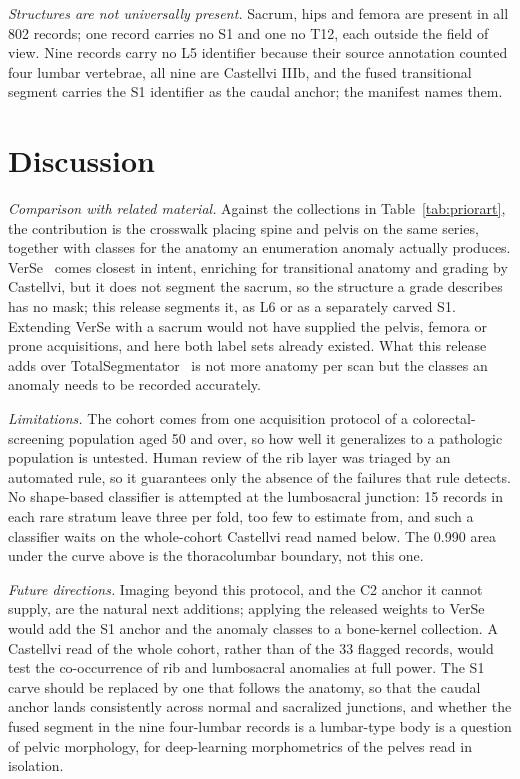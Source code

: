 \documentclass[aapm,mph,amsmath,amssymb,reprint]{revtex4-2}
\begin{document}
\emph{Structures are not universally present.} Sacrum, hips and femora are present in all 802 records; one record carries no S1 and one no T12, each outside the field of view. Nine records carry no L5 identifier because their source annotation counted four lumbar vertebrae, all nine are Castellvi IIIb, and the fused transitional segment carries the S1 identifier as the caudal anchor; the manifest names them.

\section{Discussion}

\emph{Comparison with related material.} Against the collections in
Table~\ref{tab:priorart}, the contribution is the crosswalk placing spine and pelvis on the
same series, together with classes for the anatomy an enumeration anomaly actually produces. VerSe~\cite{verse2021,versedata2021} comes closest in intent, enriching for transitional anatomy and grading by Castellvi, but it does not segment the sacrum, so the structure a grade describes has no mask; this release segments it, as L6 or as a separately carved S1. Extending VerSe with a sacrum would not have supplied the pelvis, femora or prone acquisitions, and here both label sets already existed.  What this release adds over TotalSegmentator~\cite{totalsegmentator} is not more anatomy per scan but the classes an anomaly needs to be recorded accurately. 

\emph{Limitations.}\label{sec:limitations} The cohort comes from one acquisition protocol of a colorectal-screening population aged 50 and over, so how well it generalizes to a pathologic population is untested. Human review of the rib layer was triaged by an automated rule, so it guarantees only the absence of the failures that rule detects. No shape-based classifier is attempted at the lumbosacral junction: 15 records in each rare stratum leave three per fold, too few to estimate from, and such a classifier waits on the whole-cohort Castellvi read named below. The 0.990 area under the curve above is the thoracolumbar boundary, not this one. 

\emph{Future directions.} Imaging beyond this protocol, and the C2 anchor it cannot supply, are the natural next additions; applying the released weights to VerSe would add the S1 anchor and the anomaly classes to a bone-kernel collection. A Castellvi read of the whole cohort, rather than of the 33 flagged records, would test the co-occurrence of rib and lumbosacral anomalies at full power. The S1 carve should be replaced by one that follows the anatomy, so that the caudal anchor lands consistently across normal and sacralized junctions, and whether the fused segment in the nine four-lumbar records is a lumbar-type body is a question of pelvic morphology, for deep-learning morphometrics of the pelves read in isolation.
\end{document}
